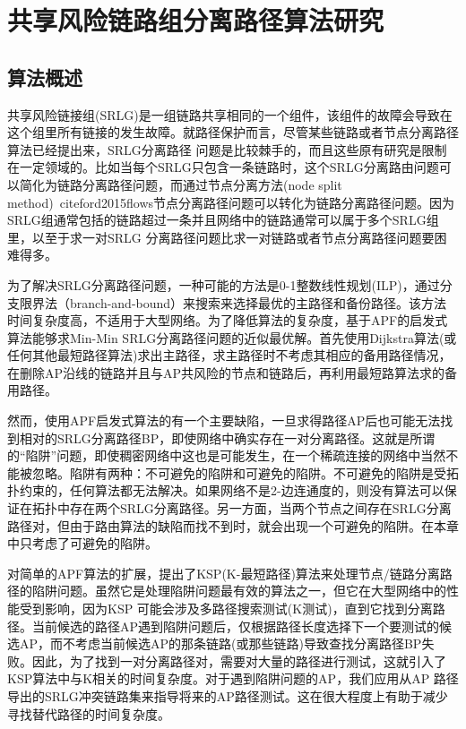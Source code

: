 \chapter{共享风险链路组分离路径算法研究}
\section{算法概述}
共享风险链接组(SRLG)是一组链路共享相同的一个组件，该组件的故障会导致在这个组里所有链接的发生故障。就路径保护而言，尽管某些链路或者节点分离路径算法\cite{suurballe1984quick,bhandari1997optimal,li1990complexity,guo2003link,xu2004finding,beshir2011variants,guo2013finding,hu2003diverse}已经提出来，SRLG分离路径 问题是比较棘手的，而且这些原有研究是限制在一定领域的。比如当每个SRLG只包含一条链路时，这个SRLG分离路由问题可以简化为链路分离路径问题，而通过节点分离方法(node split method)\ cite{ford2015flows}节点分离路径问题可以转化为链路分离路径问题。因为SRLG组通常包括的链路超过一条并且网络中的链路通常可以属于多个SRLG组里，以至于求一对SRLG 分离路径问题比求一对链路或者节点分离路径问题要困难得多。

为了解决SRLG分离路径问题，一种可能的方法是0-1整数线性规划(ILP)\cite{hu2003diverse}，通过分支限界法（branch-and-bound）来搜索来选择最优的主路径和备份路径。该方法时间复杂度高，不适用于大型网络。为了降低算法的复杂度，基于APF的启发式算法\cite{oki2002disjoint,li2002fiber,eppstein1998finding}能够求Min-Min SRLG分离路径问题的近似最优解。首先使用Dijkstra算法(或任何其他最短路径算法)求出主路径，求主路径时不考虑其相应的备用路径情况，在删除AP沿线的链路并且与AP共风险的节点和链路后，再利用最短路算法求的备用路径。

然而，使用APF启发式算法的有一个主要缺陷，一旦求得路径AP后也可能无法找到相对的SRLG分离路径BP，即使网络中确实存在一对分离路径。这就是所谓的“陷阱”问题，即使稠密网络中\cite{laborczi2001solving}这也是可能发生，在一个稀疏连接的网络中当然不能被忽略。陷阱有两种：不可避免的陷阱和可避免的陷阱。不可避免的陷阱是受拓扑约束的，任何算法都无法解决。如果网络不是2-边连通度的，则没有算法可以保证在拓扑中存在两个SRLG分离路径。另一方面，当两个节点之间存在SRLG分离路径对，但由于路由算法的缺陷而找不到时，就会出现一个可避免的陷阱。在本章中只考虑了可避免的陷阱。

对简单的APF算法的扩展，提出了KSP(K-最短路径)算法来处理节点/链路分离路径的陷阱问题。虽然它是处理陷阱问题最有效的算法之一，但它在大型网络中的性能受到影响，因为KSP 可能会涉及多路径搜索测试(K测试)，直到它找到分离路径。当前候选的路径AP遇到陷阱问题后，仅根据路径长度选择下一个要测试的候选AP，而不考虑当前候选AP的那条链路(或那些链路)导致查找分离路径BP失败。因此，为了找到一对分离路径对，需要对大量的路径进行测试，这就引入了KSP算法中与K相关的时间复杂度。对于遇到陷阱问题的AP，我们应用从AP 路径导出的SRLG冲突链路集来指导将来的AP路径测试。这在很大程度上有助于减少寻找替代路径的时间复杂度。

